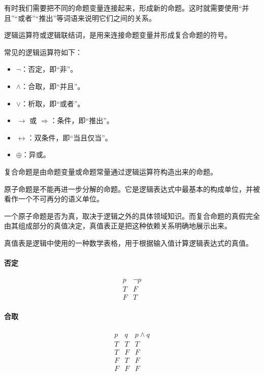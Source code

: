 有时我们需要把不同的命题变量连接起来，形成新的命题。这时就需要使用“并且”“或者”“推出”等词语来说明它们之间的关系。

\begin{definition}
逻辑运算符或逻辑联结词，是用来连接命题变量并形成复合命题的符号。
\end{definition}

常见的逻辑运算符如下：

\begin{itemize}
    \item $\neg$：否定，即“非”。
    \item $\wedge$：合取，即“并且”。
    \item $\vee$：析取，即“或者”。
    \item $\to$ 或 $\Rightarrow$：条件，即“推出”。
    \item $\leftrightarrow$：双条件，即“当且仅当”。
    \item $\oplus$：异或。
\end{itemize}

\begin{definition}[复合命题]
复合命题是由命题变量或命题常量通过逻辑运算符构造出来的命题。
\end{definition}

\begin{definition}[原子命题]
原子命题是不能再进一步分解的命题。它是逻辑表达式中最基本的构成单位，并被看作一个不可再分的语义单位。
\end{definition}

一个原子命题是否为真，取决于逻辑之外的具体领域知识。而复合命题的真假完全由其组成部分的真值决定，真值表正是把这种依赖关系明确地展示出来。

\begin{definition}[真值表]
真值表是逻辑中使用的一种数学表格，用于根据输入值计算逻辑表达式的真值。
\end{definition}

\paragraph{否定}
\[
\begin{array}{c|c}
p & \neg p \\
\hline
T & F \\
F & T
\end{array}
\]

\paragraph{合取}
\[
\begin{array}{c|c|c}
p & q & p\wedge q \\
\hline
T & T & T \\
T & F & F \\
F & T & F \\
F & F & F
\end{array}
\]

